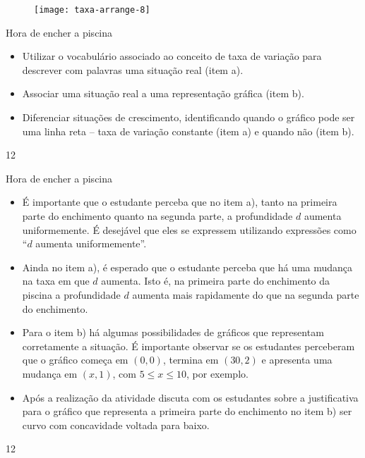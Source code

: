 \begin{figure}[H]
\centering
\texttt{[image: taxa-arrange-8]}
\end{figure}

\clearpage
\def\currentcolor{session2}
\begin{objectives}{Hora de encher a piscina}
{
\begin{itemize}

\item Utilizar o vocabulário associado ao conceito de taxa de variação para descrever com palavras uma situação real (item a).

\item Associar uma situação real a uma representação gráfica (item b).

\item Diferenciar situações de crescimento, identificando quando o gráfico pode ser uma linha reta – taxa de variação constante (item a) e quando não (item b).

\end{itemize}
}{1}{2}
\end{objectives}
\begin{sugestions}{Hora de encher a piscina}
{
\begin{itemize}
\item É importante que o estudante perceba que no item a), tanto na primeira parte do
enchimento quanto na segunda parte, a profundidade $d$ aumenta uniformemente. É
desejável que eles se expressem utilizando expressões como “$d$ aumenta
uniformemente”.
\item Ainda no item a), é esperado que o estudante perceba que há uma mudança na taxa em
que $d$ aumenta. Isto é, na primeira parte do enchimento da piscina a profundidade $d$
aumenta mais rapidamente do que na segunda parte do enchimento.
\item Para o item b) há algumas possibilidades de gráficos que representam corretamente a
situação. É importante observar se os estudantes perceberam que o gráfico começa em
$(0,0)$, termina em $(30,2)$ e apresenta uma mudança em $(x, 1)$, com $5\leq x \leq 10$, por
exemplo.
\item Após a realização da atividade discuta com os estudantes sobre a justificativa para o
gráfico que representa a primeira parte do enchimento no item b) ser curvo com
concavidade voltada para baixo.
\end{itemize}
}{1}{2}
\end{sugestions}
